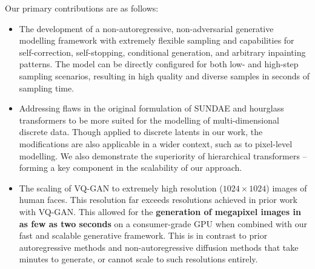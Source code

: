 \documentclass[14pt,margin=0.5in,innermargin=0in,blockverticalspace=-0.1in,colspace=-1.2cm]{tikzposter}
\begin{document}
\begin{columns}
{\begin{tcolorbox}[boxsep=0pt,top=0cm,adjusted title={\huge\bf Proposed Method},colbacktitle=colorOne]
        Our primary contributions are as follows:
        \begin{itemize}
            \item
                The development of a non-autoregressive, non-adversarial
                generative modelling framework with extremely flexible sampling
                and capabilities for self-correction, self-stopping, conditional
                generation, and arbitrary inpainting patterns. The model can be
                directly configured for both low- and high-step sampling
                scenarios, resulting in high quality and diverse samples in 
                seconds of sampling time.

            \item
                Addressing flaws in the original formulation of SUNDAE and
                hourglass transformers to be more suited for the modelling of
                multi-dimensional discrete data. Though applied to discrete
                latents in our work, the modifications are also applicable in a
                wider context, such as to pixel-level modelling. We also
                demonstrate the superiority of hierarchical transformers --
                forming a key component in the scalability of our approach. 

            \item
                The scaling of VQ-GAN to extremely high resolution ($1024 \times
                1024$) images of human faces. This resolution far exceeds
                resolutions achieved in prior work with VQ-GAN. This allowed for
                the \textbf{generation of megapixel images in as few as two
                seconds} on a consumer-grade GPU when combined with our fast and
                scalable generative framework. This is in contrast to prior
                autoregressive methods and non-autoregressive diffusion methods
                that take minutes to generate, or cannot scale to such
                resolutions entirely.

        \end{itemize}
        \end{tcolorbox}
    }


\end{columns}
\end{document}
